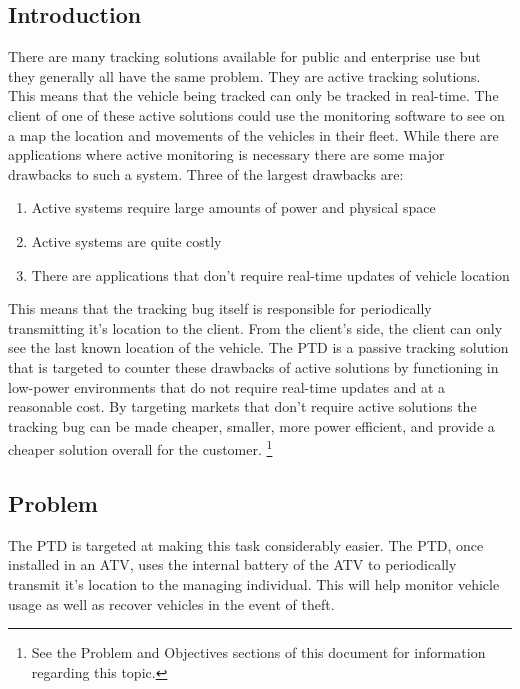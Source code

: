 \documentclass[11pt]{article}
\begin{document}
\subsection{Introduction}
There are many tracking solutions available for public and enterprise use but they generally all have the same problem. They are active tracking 
solutions. This means that the vehicle being tracked can only be tracked in real-time. The client of one of these active solutions could use the 
monitoring software to see on a map the location and movements of the vehicles in their fleet. While there are applications where 
active monitoring is necessary there are some major drawbacks to such a system. Three of the largest drawbacks are:
\begin{enumerate}
    \item Active systems require large amounts of power and physical space
    \item Active systems are quite costly
    \item There are applications that don't require real-time updates of vehicle location
\end{enumerate}
This means that the tracking bug itself is responsible for periodically transmitting it's location to the client. From the client's side, the client 
can only see the last known location of the vehicle. The PTD is a passive tracking solution that is targeted to counter these drawbacks of active 
solutions by functioning in low-power environments that do not require real-time updates and at a reasonable cost. By targeting markets that don't require 
active solutions the tracking bug can be made cheaper, smaller, more power efficient, and provide a cheaper solution overall for the customer.  
\footnote{See the Problem and Objectives sections of this document for information 
regarding this topic.}


\subsection{Problem}
The PTD is targeted at making this task considerably easier. 
The PTD, once installed in an ATV, uses the internal battery of the ATV to periodically transmit it's location to the managing individual. This will help 
monitor vehicle usage as well as recover vehicles in the event of theft.
\end{document}
